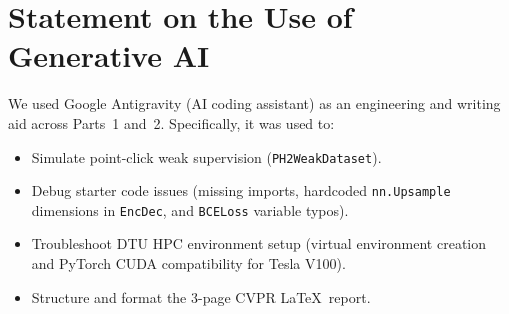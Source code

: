 \section*{Statement on the Use of Generative AI}
We used Google Antigravity (AI coding assistant) as an engineering and writing aid across Parts~1 and~2. Specifically, it was used to:
\begin{itemize}
    \item Simulate point-click weak supervision (\texttt{PH2WeakDataset}).
    \item Debug starter code issues (missing imports, hardcoded \texttt{nn.Upsample} dimensions in \texttt{EncDec}, and \texttt{BCELoss} variable typos).
    \item Troubleshoot DTU HPC environment setup (virtual environment creation and PyTorch CUDA compatibility for Tesla V100).
    \item Structure and format the 3-page CVPR \LaTeX\ report.
\end{itemize}
